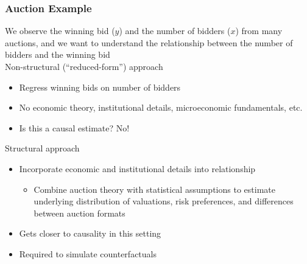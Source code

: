 \documentclass{beamer}
\begin{document}
\begin{frame}\frametitle{Auction Example}
    We observe the winning bid ($y$) and the number of bidders ($x$) from many auctions, and we want to understand the relationship between the number of bidders and the winning bid \\
    \vspace{1.5ex}
    Non-structural (``reduced-form'') approach
    \begin{itemize}
        \item Regress winning bids on number of bidders
        \item No economic theory, institutional details, microeconomic fundamentals, etc.
        \item Is this a causal estimate? No!
    \end{itemize}
    \vspace{1.5ex}
    Structural approach
    \begin{itemize}
        \item Incorporate economic and institutional details into relationship
        \begin{itemize}
            \item Combine auction theory with statistical assumptions to estimate underlying distribution of valuations, risk preferences, and differences between auction formats
        \end{itemize}
        \item Gets closer to causality in this setting
        \item Required to simulate counterfactuals
    \end{itemize}
\end{frame}
\end{document}
